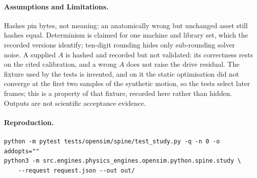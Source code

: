 \paragraph{Assumptions and Limitations.}
Hashes pin bytes, not meaning: an anatomically wrong but unchanged asset still
hashes equal. Determinism is claimed for one machine and library set, which
the recorded versions identify; ten-digit rounding hides only sub-rounding
solver noise. A supplied $A$ is hashed and recorded but not validated: its
correctness rests on the cited calibration, and a wrong $A$ does not raise the
drive residual. The fixture used by the tests is invented, and on it the static
optimisation did not converge at the first two samples of the synthetic motion,
so the tests select later frames; this is a property of that fixture, recorded
here rather than hidden. Outputs are not scientific acceptance evidence.

\paragraph{Reproduction.}
\begin{verbatim}
python -m pytest tests/opensim/spine/test_study.py -q -n 0 -o addopts=""
python3 -m src.engines.physics_engines.opensim.python.spine.study \
    --request request.json --out out/
\end{verbatim}
